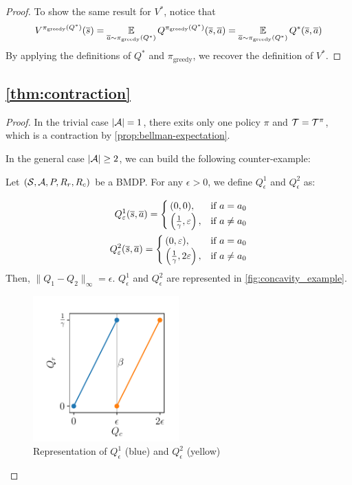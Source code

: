\begin{subappendices}
\begin{proof}
	To show the same result for $V^*$, notice that 
	\begin{equation*}
	V^{\pi_\text{greedy}(Q^*)}(\overline{s}) = \operatorname*{\mathbb{E}}\limits_{\overline{a}\sim\pi_\text{greedy}(Q^*)}Q^{\pi_\text{greedy}(Q^*)}(\overline{s},\overline{a}) = \operatorname*{\mathbb{E}}\limits_{\overline{a}\sim\pi_\text{greedy}(Q^*)}Q^*(\overline{s},\overline{a})
	\end{equation*}
	By applying the definitions of $Q^*$ and $\pi_\text{greedy}$, we recover the definition of $V^*$.
\end{proof}

\subsection{\autoref{thm:contraction}}
\label{sec:proof_contraction}
\begin{proof}
	In the trivial case $|\mathcal{A}| = 1$, there exits only one policy $\pi$ and $\mathcal{T} = \mathcal{T}^\pi$, which is a contraction by \autoref{prop:bellman-expectation}.
	
	In the general case $|\mathcal{A}| \geq 2$, we can build the following counter-example:
	
	Let $(\mathcal{S}, \mathcal{A}, P, R_r, R_c)$ be a BMDP.
	For any $\epsilon > 0$, we define $Q_\epsilon^1$ and $Q_\epsilon^2$ as:
	
	\begin{align*}
	Q_\varepsilon^1(\overline{s},\overline{a}) =
	\begin{cases}
	(0, 0), & \text{if } a = a_0 \\
	\left(\frac{1}{\gamma}, \varepsilon\right), & \text{if } a \neq a_0
	\end{cases}\\
	Q_\varepsilon^2(\overline{s},\overline{a}) =
	\begin{cases}
	(0, \varepsilon), & \text{if } a = a_0 \\
	\left(\frac{1}{\gamma}, 2\varepsilon\right), & \text{if } a \neq a_0
	\end{cases}
	\end{align*}
	Then, $\|Q_1-Q_2\|_\infty = \epsilon$.
	$Q_\epsilon^1$ and $Q_\epsilon^2$ are represented in \autoref{fig:concavity_example}.
	
	\begin{figure}[tp]
		\centering
		\includegraphics[width=0.5\textwidth]{img/concavity_example.pdf}
		\caption{Representation of $Q_\epsilon^1$ (blue) and $Q_\epsilon^2$ (yellow)}
		\label{fig:concavity_example}
	\end{figure}
	

\end{proof}
\end{subappendices}
